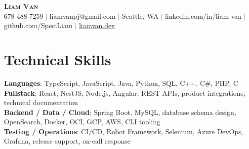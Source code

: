 \documentclass[letterpaper,11pt]{article}
\begin{document}

%
\begin{center}
    \textbf{\Huge \scshape Liam Van} \\ \vspace{1pt}
    \small 678-488-7259 $|$ \small {liamvanpj@gmail.com} $|$ Seattle, WA
 {{$|$ linkedin.com/in/liam-van} {$|$ github.com/SpeciLiam} {$|$ \href{https://liamvan.dev}{liamvan.dev}}}

\end{center}

\section{Technical Skills}
 \begin{itemize}[leftmargin=0.15in, label={}]
    \small{\item{
     \textbf{Languages}{: TypeScript, JavaScript, Java, Python, SQL, C++, C\#, PHP, C} \\
     \textbf{Fullstack}{: React, NestJS, Node.js, Angular, REST APIs, product integrations, technical documentation} \\
     \textbf{Backend / Data / Cloud}{: Spring Boot, MySQL, database schema design, OpenSearch, Docker, OCI, GCP, AWS, CLI tooling} \\
     \textbf{Testing / Operations}{: CI/CD, Robot Framework, Selenium, Azure DevOps, Grafana, release support, on-call response} \\
    }}
 \end{itemize}
%

\end{document}
